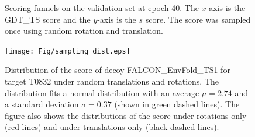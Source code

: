 \documentclass[letter,10pt]{article}
\begin{document}
\begin{figure}[H]

    \centering

    \caption{Scoring funnels on the validation set at epoch 40. The
      $x$-axis is the GDT\_TS score and the $y$-axis is the $s$
      score. The score was sampled once using random rotation and
      translation.}
%
    \label{Fig:ValidationEpoch40}
\end{figure}



\begin{figure}[H]
    \centering
    \texttt{[image: Fig/sampling\_dist.eps]}
%
    \caption{Distribution of the score of decoy FALCON\_EnvFold\_TS1
    for target T0832 under random translations and rotations. The
    distribution fits a normal distribution with an average $\mu =
    2.74$ and a standard deviation $\sigma = 0.37$ (shown in green
    dashed lines). The figure also shows the distributions of the
    score under rotations only (red lines) and under translations only
    (black dashed lines).}
%
    \label{Fig:ScoreDistribution}
\end{figure}
\end{document}
